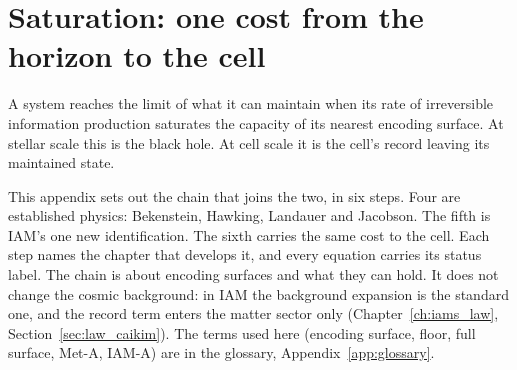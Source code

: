 \chapter{Saturation: one cost from the horizon to the cell}\label{app:saturation}

A system reaches the limit of what it can maintain when its rate of irreversible information production saturates the capacity of its
nearest encoding surface. At stellar scale this is the black hole. At cell scale it is the cell's record leaving its maintained state.

This appendix sets out the chain that joins the two, in six steps. Four are established physics: Bekenstein, Hawking, Landauer and Jacobson. The
fifth is IAM's one new identification. The sixth carries the same cost to the cell. Each step names the chapter that develops it, and every
equation carries its status label. The chain is about encoding surfaces and what they can hold. It does not change the cosmic background: in IAM
the background expansion is the standard one, and the record term enters the matter sector only (Chapter~\ref{ch:iams_law},
Section~\ref{sec:law_caikim}). The terms used here (encoding surface, floor, full surface, Met-A, IAM-A) are in the glossary,
Appendix~\ref{app:glossary}.

